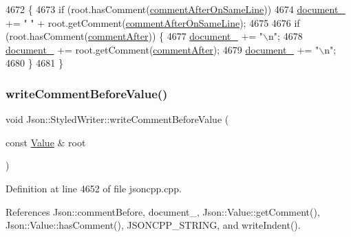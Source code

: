 \begin{DoxyCode}
4672                                                                      \{
4673   \textcolor{keywordflow}{if} (root.hasComment(\hyperlink{namespace_json_a4fc417c23905b2ae9e2c47d197a45351a008a230a0586de54f30b76afe70fdcfa}{commentAfterOnSameLine}))
4674     \hyperlink{class_json_1_1_styled_writer_ae967b0c77e4d7cb889ce7b6ee4ce28d7}{document\_} += \textcolor{stringliteral}{" "} + root.getComment(\hyperlink{namespace_json_a4fc417c23905b2ae9e2c47d197a45351a008a230a0586de54f30b76afe70fdcfa}{commentAfterOnSameLine});
4675 
4676   \textcolor{keywordflow}{if} (root.hasComment(\hyperlink{namespace_json_a4fc417c23905b2ae9e2c47d197a45351ac5784ca53b12250888ddb642b06aebef}{commentAfter})) \{
4677     \hyperlink{class_json_1_1_styled_writer_ae967b0c77e4d7cb889ce7b6ee4ce28d7}{document\_} += \textcolor{stringliteral}{"\(\backslash\)n"};
4678     \hyperlink{class_json_1_1_styled_writer_ae967b0c77e4d7cb889ce7b6ee4ce28d7}{document\_} += root.getComment(\hyperlink{namespace_json_a4fc417c23905b2ae9e2c47d197a45351ac5784ca53b12250888ddb642b06aebef}{commentAfter});
4679     \hyperlink{class_json_1_1_styled_writer_ae967b0c77e4d7cb889ce7b6ee4ce28d7}{document\_} += \textcolor{stringliteral}{"\(\backslash\)n"};
4680   \}
4681 \}
\end{DoxyCode}
\mbox{\label{class_json_1_1_styled_writer_ad3452c48fabf968bf3693549331ec06e}} 
\subsubsection{\texorpdfstring{write\+Comment\+Before\+Value()}{writeCommentBeforeValue()}}
{\footnotesize\ttfamily void Json\+::\+Styled\+Writer\+::write\+Comment\+Before\+Value (\begin{DoxyParamCaption}\item[{const \hyperlink{class_json_1_1_value}{Value} \&}]{root }\end{DoxyParamCaption})\hspace{0.3cm}{\ttfamily [private]}}



Definition at line 4652 of file jsoncpp.\+cpp.



References Json\+::comment\+Before, document\+\_\+, Json\+::\+Value\+::get\+Comment(), Json\+::\+Value\+::has\+Comment(), J\+S\+O\+N\+C\+P\+P\+\_\+\+S\+T\+R\+I\+NG, and write\+Indent().



